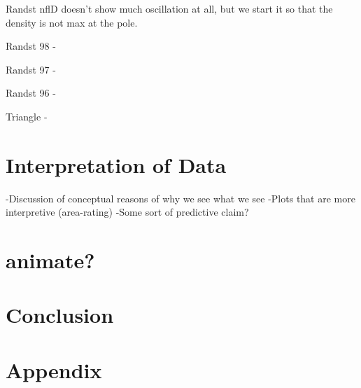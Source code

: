 \documentclass[letterpaper,twocolumn,amsmath,amssymb,pre]{revtex4-1}
\begin{document}
Randst nflD doesn't show much oscillation at all, but we start it so
that the density is not max at the pole.






Randst 98 -

Randst 97 -

Randst 96 -

Triangle -


\section{Interpretation of Data}
-Discussion of conceptual reasons of why we see what we see
-Plots that are more interpretive (area-rating)
-Some sort of predictive claim?

\section{animate?}



\section{Conclusion}


\appendix

\section*{Appendix}
\end{document}
